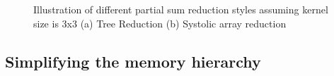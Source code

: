 \begin{figure}
    \centering
    \caption{Illustration of different partial sum reduction styles assuming kernel size is 3x3 (a) Tree Reduction (b) Systolic array reduction}
    \label{fig:reduction_styles}
\end{figure}

\subsection{Simplifying the memory hierarchy}
\label{chap:dda:hw_dse:simplifying_hierarchy}

